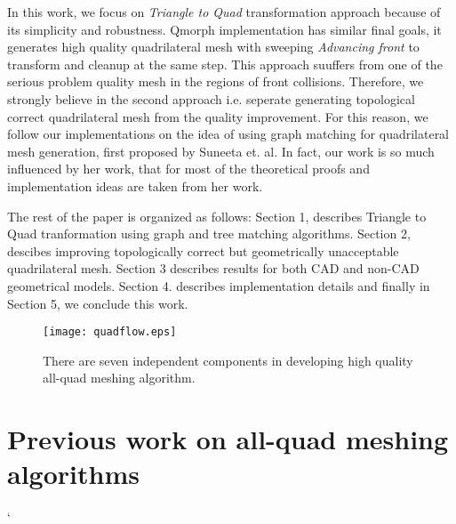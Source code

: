\documentclass[11pt, a4paper]{paper}
\begin{document}
In this work, we focus on {\em Triangle to Quad} transformation approach because of its simplicity and
robustness. Qmorph implementation has similar final goals, it generates high quality quadrilateral mesh
with sweeping {\em Advancing front } to transform and cleanup at the same step. This approach suuffers
from one of the serious problem quality mesh in the regions of front collisions. Therefore, we strongly
believe in the second approach i.e. seperate generating topological correct quadrilateral mesh from the
quality improvement. For this reason, we follow our implementations on the idea of using graph matching
for quadrilateral mesh generation, first proposed by Suneeta et. al. In fact, our work is so much influenced
by her work, that for most of the theoretical proofs and implementation ideas are taken from her work.  

The rest of the paper is organized as follows: Section 1, describes Triangle to Quad tranformation using graph and tree matching algorithms. Section 2, descibes improving topologically correct but geometrically unacceptable quadrilateral mesh. Section 3 describes results for both CAD and non-CAD geometrical models.
Section 4. describes implementation details and finally in Section 5, we conclude this work.
 \begin{figure}
 \begin{center}
 \texttt{[image: quadflow.eps]}
 \caption{There are seven independent components in developing high quality all-quad meshing algorithm.}
 \end{center}
 \label{fig:flowchart}
\end{figure} 
\section {Previous work on all-quad meshing algorithms}



`
\end{document}
